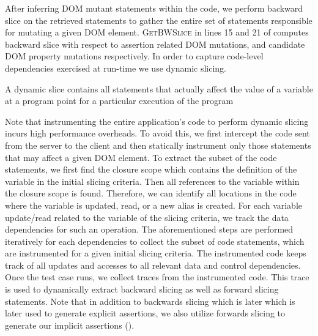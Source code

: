After inferring DOM mutant statements within the code, we perform backward slice on the retrieved statements to gather the entire set of \javascript statements responsible for mutating a given DOM element.
\textsc{GetBWSlice} in lines  15 and 21 of  computes backward slice with respect to assertion related DOM mutations, and candidate DOM property mutations respectively.
In order to capture code-level dependencies exercised at run-time we use dynamic slicing.
\begin{mydef}
\label{def:dynamicSlicing}
A dynamic slice contains all statements that actually affect the value of a variable at a program point for a particular execution of the program 
\end{mydef}
Note that instrumenting the entire application's code to perform dynamic slicing incurs high performance overheads. To avoid this, we first intercept the code sent from the server to the client and then statically instrument only those statements that may affect a given DOM element.
To extract the subset of the code statements, we first find the \javascript closure scope which contains the definition of the variable in the initial slicing criteria. Then all references to the variable within the closure scope is found. Therefore, we can identify all locations in the code where the variable is updated, read, or a new alias is created. For each variable update/read related to the variable of the slicing criteria, we track the data dependencies for such an operation. The aforementioned steps are performed iteratively for each dependencies to collect the subset of code statements, which are instrumented for a given initial slicing criteria.
The instrumented code keeps track of all updates and accesses to all relevant data and control dependencies.   
Once the test case runs, we collect traces from the instrumented code. This trace is used to dynamically extract backward slicing as well as forward slicing statements. Note that in addition to backwards slicing which is later which is later used to generate explicit assertions, we also utilize forwards slicing to generate our implicit assertions ().  

